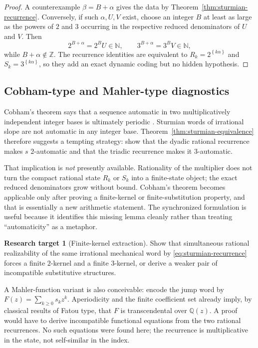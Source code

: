 \documentclass[11pt,oneside]{article}
\theoremstyle{definition}
\newtheorem{target}[theorem]{Research target}
\theoremstyle{remark}
\newcommand{\N}{\mathbb N}
\newcommand{\Z}{\mathbb Z}
\newcommand{\Q}{\mathbb Q}
\newcommand{\fract}[1]{\left\{#1\right\}}
\begin{document}
\begin{proof}
A counterexample $\beta=B+\alpha$ gives the data by
Theorem~\ref{thm:sturmian-recurrence}.  Conversely, if such $\alpha,U,V$ exist, choose an
integer $B$ at least as large as the powers of $2$ and $3$ occurring in the respective
reduced denominators of $U$ and $V$.  Then
\[
  2^{B+\alpha}=2^BU\in\N,
  \qquad
  3^{B+\alpha}=3^BV\in\N,
\]
while $B+\alpha\notin\Z$.  The recurrence identities are equivalent to
$R_k=2^{\fract{k\alpha}}$ and $S_k=3^{\fract{k\alpha}}$, so they add an exact dynamic coding
but no hidden hypothesis.
\end{proof}

\subsection{Cobham-type and Mahler-type diagnostics}

Cobham's theorem says that a sequence automatic in two multiplicatively independent integer
bases is ultimately periodic \cite{Cobham1972,AlloucheShallit2003}.  Sturmian words of
irrational slope are not automatic in any integer base.  Theorem~\ref{thm:sturmian-equivalence}
therefore suggests a tempting strategy: show that the dyadic rational recurrence makes $s$
$2$-automatic and that the triadic recurrence makes it $3$-automatic.

That implication is \emph{not} presently available.  Rationality of the multiplier does not
turn the compact rational state $R_k$ or $S_k$ into a finite-state object; the exact reduced
denominators grow without bound.  Cobham's theorem becomes applicable only after proving a
finite-kernel or finite-substitution property, and that is essentially a new arithmetic
statement.  The synchronized formulation is useful because it identifies this missing lemma
cleanly rather than treating ``automaticity'' as a metaphor.

\begin{target}[Finite-kernel extraction]
Show that simultaneous rational realizability of the same irrational mechanical word by
\eqref{eq:sturmian-recurrence} forces a finite $2$-kernel and a finite $3$-kernel, or derive a
weaker pair of incompatible substitutive structures.
\end{target}

A Mahler-function variant is also conceivable: encode the jump word by
$F(z)=\sum_{k\ge0}s_kz^k$.  Aperiodicity and the finite coefficient set already imply, by
classical results of Fatou type, that $F$ is transcendental over $\Q(z)$.  A proof would have
to derive incompatible functional equations from the two rational recurrences.  No such
equations were found here; the recurrence is multiplicative in the state, not self-similar in
the index.
\end{document}
